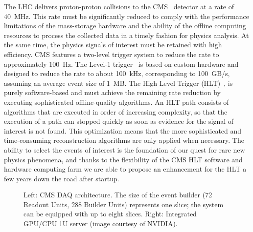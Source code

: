 \documentclass{JINST}
\begin{document}
The LHC delivers proton-proton collisions to the CMS~\cite{CMS:1994hea} detector at a rate of 40~MHz. This rate
must be significantly reduced to comply with the performance limitations of the mass-storage hardware and the ability
of the offline computing resources to process the collected data in a timely fashion for physics analysis. At the same
time, the physics signals of interest must be retained with high efficiency. CMS features a two-level trigger system to reduce
the rate to approximately 100~Hz. The Level-1 trigger~\cite{Dasu:2000ge} is based on custom hardware and designed to reduce the rate
to about 100~kHz, corresponding to 100~GB/s, assuming an average event size of 1~MB. The High Level Trigger (HLT)~\cite{Sphicas:2002gg},\cite{Sakulin:2007rj}
is purely software-based and must achieve the remaining rate reduction by executing sophisticated offline-quality algorithms.
An HLT path consists of algorithms that are executed in order of increasing complexity, so that
the execution of a path can stopped quickly as soon as evidence for the signal of interest is not found.
This optimization means that the more sophisticated and time-consuming reconstruction algorithms are only applied when necessary.
The ability to select the events of interest is the foundation of our
quest for rare new physics phenomena, and thanks to the flexibility of the CMS HLT software and hardware computing farm we are  able
to propose an enhancement for the HLT a few years down the road after startup.

\begin{figure}[!Hhtb]
  \begin{center}
      \caption{Left: CMS DAQ architecture. The size of the event builder (72 Readout Units, 288 Builder Units) represents one slice; the system can be equipped with up to eight slices. Right: Integrated GPU/CPU 1U server (image courtesy of NVIDIA).}
  \end{center}
\end{figure}
\end{document}
